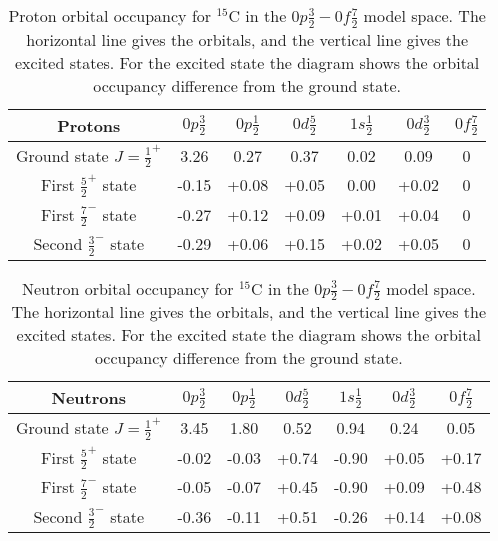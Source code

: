 \begin{table}
\begin{center}
\begin{tabular}{|c|c|c|c|c|c|c|}
	\hline
	Protons & $0p\frac32$ & $0p\frac12$ & $0d\frac52$ & $1s\frac12$ & $0d\frac32$ & $0f\frac72$ \\
	\hline
	Ground state $J=\frac12^+$ & 3.26 & 0.27 & 0.37 & 0.02 & 0.09 & 0 \\
	\hline
	First $\frac52^+$ state & -0.15 & +0.08 & +0.05 & 0.00 & +0.02 & 0 \\
	\hline
	First $\frac72^-$ state & -0.27 & +0.12 & +0.09 & +0.01 & +0.04 & 0 \\
	\hline
	Second $\frac32^-$ state & -0.29 & +0.06 & +0.15 & +0.02 & +0.05 & 0 \\
	\hline
\end{tabular}
\caption{Proton orbital occupancy for $^{15}$C in the $0p\frac32-0f\frac72$ model space. The horizontal line gives the orbitals, and the vertical line gives the excited states. For the excited state the diagram shows the orbital occupancy difference from the ground state.}
\label{C15_0f7_p}
\end{center}
\end{table}

\begin{table}
\begin{center}
\begin{tabular}{|c|c|c|c|c|c|c|}
	\hline
	Neutrons & $0p\frac32$ & $0p\frac12$ & $0d\frac52$ & $1s\frac12$ & $0d\frac32$ & $0f\frac72$ \\
	\hline
	Ground state $J=\frac12^+$ & 3.45 & 1.80 & 0.52 & 0.94 & 0.24 & 0.05 \\
	\hline
	First $\frac52^+$ state & -0.02 & -0.03 & +0.74 & -0.90 & +0.05 & +0.17 \\
	\hline
	First $\frac72^-$ state & -0.05 & -0.07 & +0.45 & -0.90 & +0.09 & +0.48 \\
	\hline
	Second $\frac32^-$ state & -0.36 & -0.11 & +0.51 & -0.26 & +0.14 & +0.08 \\
	\hline
\end{tabular}
\caption{Neutron orbital occupancy for $^{15}$C in the $0p\frac32-0f\frac72$ model space. The horizontal line gives the orbitals, and the vertical line gives the excited states. For the excited state the diagram shows the orbital occupancy difference from the ground state.}
\label{C15_0f7_n}
\end{center}
\end{table}

\clearpage
